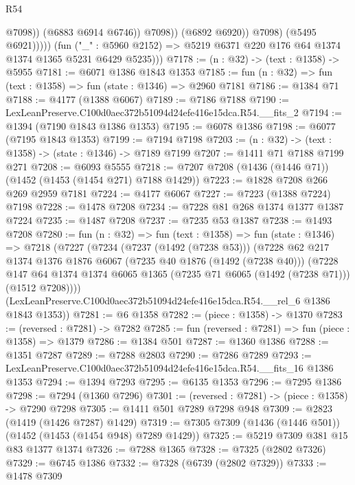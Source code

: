 \begin{lexlean}{R54}
\begin{coremodule}
                              @7098))
                          (@6883 @6914 @6746))
                        @7098))
                    (@6892 @6920))
                  @7098)
                (@5495 @6921)))))
        (fun ("_" : @5960 @2152) => @5219 @6371 @220 @176 @64 @1374 @1374 @1365 @5231 @6429 @5235)))
@7178 := (n : @32) -> (text : @1358) -> @5955
@7181 := @6071 @1386 @1843 @1353
@7185 := fun (n : @32) => fun (text : @1358) => fun (state : @1346) => @2960 @7181
@7186 := @1384 @71
@7188 := @4177 (@1388 @6067)
@7189 := @7186 @7188
@7190 := LexLeanPreserve.C100d0aec372b51094d24efe416e15dca.R54.__fits_2
@7194 := @1394 (@7190 @1843 @1386 @1353)
@7195 := @6078 @1386
@7198 := @6077 (@7195 @1843 @1353)
@7199 := @7194 @7198
@7203 := (n : @32) -> (text : @1358) -> (state : @1346) -> @7189 @7199
@7207 := @1411 @71 @7188 @7199 @271
@7208 := @6093 @5555
@7218 := @7207 @7208 (@1436 (@1446 @71)) (@1452 (@1453 (@1454 @271) @7188 @1429))
@7223 := @1828 @7208 @266 @269 @2959 @7181
@7224 := @4177 @6067
@7227 := @7223 (@1388 @7224) @7198
@7228 := @1478 @7208
@7234 := @7228 @81 @268 @1374 @1377 @1387 @7224
@7235 := @1487 @7208
@7237 := @7235 @53 @1387
@7238 := @1493 @7208
@7280 := fun (n : @32) =>
  fun (text : @1358) =>
  fun (state : @1346) =>
  @7218
    (@7227
      (@7234
        (@7237 (@1492 (@7238 @53)))
        (@7228
          @62
          @217
          @1374
          @1376
          @1876
          @6067
          (@7235 @40 @1876 (@1492 (@7238 @40)))
          (@7228
            @147
            @64
            @1374
            @1374
            @6065
            @1365
            (@7235 @71 @6065 (@1492 (@7238 @71)))
            (@1512 @7208))))
      (LexLeanPreserve.C100d0aec372b51094d24efe416e15dca.R54.__rel_6 @1386 @1843 @1353))
@7281 := @6 @1358
@7282 := (piece : @1358) -> @1370
@7283 := (reversed : @7281) -> @7282
@7285 := fun (reversed : @7281) => fun (piece : @1358) => @1379
@7286 := @1384 @501
@7287 := @1360 @1386
@7288 := @1351 @7287
@7289 := @7288 @2803
@7290 := @7286 @7289
@7293 := LexLeanPreserve.C100d0aec372b51094d24efe416e15dca.R54.__fits_16 @1386 @1353
@7294 := @1394 @7293
@7295 := @6135 @1353
@7296 := @7295 @1386
@7298 := @7294 (@1360 @7296)
@7301 := (reversed : @7281) -> (piece : @1358) -> @7290 @7298
@7305 := @1411 @501 @7289 @7298 @948
@7309 := @2823 (@1419 (@1426 @7287) @1429)
@7319 := @7305 @7309 (@1436 (@1446 @501)) (@1452 (@1453 (@1454 @948) @7289 @1429))
@7325 := @5219 @7309 @381 @15 @83 @1377 @1374
@7326 := @7288 @1365
@7328 := @7325 (@2802 @7326)
@7329 := @6745 @1386
@7332 := @7328 (@6739 (@2802 @7329))
@7333 := @1478 @7309

\end{coremodule}
\end{lexlean}
